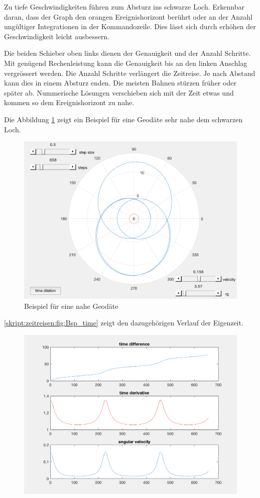 \begin{refsection}
    Zu tiefe Geschwindigkeiten führen zum Absturz ins schwarze Loch. Erkennbar daran, dass der Graph den orangen Ereignishorizont berührt oder an der Anzahl ungültiger Integrationen in der Kommandozeile. Dies lässt sich durch erhöhen der Geschwindigkeit leicht ausbessern.
    
    Die beiden Schieber oben links dienen der Genauigkeit und der Anzahl Schritte. Mit genügend Rechenleistung kann die Genauigkeit bis an den linken Anschlag vergrössert werden. Die Anzahl Schritte verlängert die Zeitreise. Je nach Abstand kann dies in einem Absturz enden. Die meisten Bahnen stürzen früher oder später ab. Nummerische Lösungen verschieben sich mit der Zeit etwas und kommen so dem Ereignishorizont zu nahe.
    
    Die Abbildung \ref{skript:zeitreisen:fig:Bsp} zeigt ein Beispiel für eine Geodäte sehr nahe dem schwarzen Loch.
      \begin{figure}
        \centering
        \includegraphics[width=12cm]{zeitreisen/Bsp.png}
        \caption{Beispiel für eine nahe Geodäte}
        \label{skript:zeitreisen:fig:Bsp} 
    \end{figure}
    \ref{skript:zeitreisen:fig:Bsp_time} zeigt den dazugehörigen Verlauf der Eigenzeit.
      \begin{figure}
        \centering
        \includegraphics[width=12cm]{zeitreisen/Bsp_time.png}

\end{figure}
\end{refsection}
